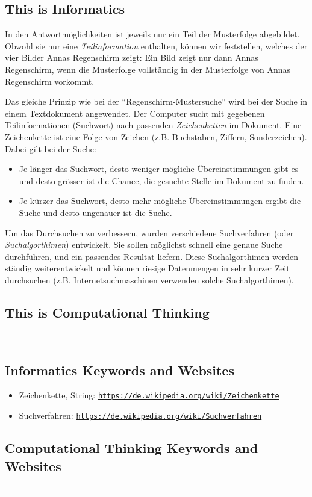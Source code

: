 \documentclass[a4paper,11pt]{report}
\newcommand{\BrochureUrlText}[1]{\texttt{#1}}
\begin{document}
\subsection*{This is Informatics}

In den Antwortmöglichkeiten ist jeweils nur ein Teil der Musterfolge abgebildet. Obwohl sie nur eine \emph{Teilinformation} enthalten, können wir feststellen, welches der vier Bilder Annas Regenschirm zeigt: Ein Bild zeigt nur dann Annas Regenschirm, wenn die Musterfolge vollständig in der Musterfolge von Annas Regenschirm vorkommt.

Das gleiche Prinzip wie bei der \enquote{Regenschirm-Mustersuche} wird bei der Suche in einem Textdokument angewendet. Der Computer sucht mit gegebenen Teilinformationen (Suchwort) nach passenden \emph{Zeichenketten} im Dokument. Eine Zeichenkette ist eine Folge von Zeichen (z.B. Buchstaben, Ziffern, Sonderzeichen).
Dabei gilt bei der Suche:

\begin{itemize}
  \item Je länger das Suchwort, desto weniger mögliche Übereinstimmungen gibt es und desto grösser ist die Chance, die gesuchte Stelle im Dokument zu finden.
  \item Je kürzer das Suchwort, desto mehr mögliche Übereinstimmungen ergibt die Suche und desto ungenauer ist die Suche.
\end{itemize}

Um das Durchsuchen zu verbessern, wurden verschiedene Suchverfahren (oder \emph{Suchalgorthimen}) entwickelt. Sie sollen möglichst schnell eine genaue Suche durchführen, und ein passendes Resultat liefern. Diese Suchalgorthimen werden ständig weiterentwickelt und können riesige Datenmengen in sehr kurzer Zeit durchsuchen (z.B. Internetsuchmaschinen verwenden solche Suchalgorthimen).


\subsection*{This is Computational Thinking}

–


\subsection*{Informatics Keywords and Websites}

\begin{itemize}
  \item Zeichenkette, String: \href{https://de.wikipedia.org/wiki/Zeichenkette}{\BrochureUrlText{https://de.wikipedia.org/wiki/Zeichenkette}}
  \item Suchverfahren: \href{https://de.wikipedia.org/wiki/Suchverfahren}{\BrochureUrlText{https://de.wikipedia.org/wiki/Suchverfahren}}
\end{itemize}


\subsection*{Computational Thinking Keywords and Websites}

–
\end{document}
